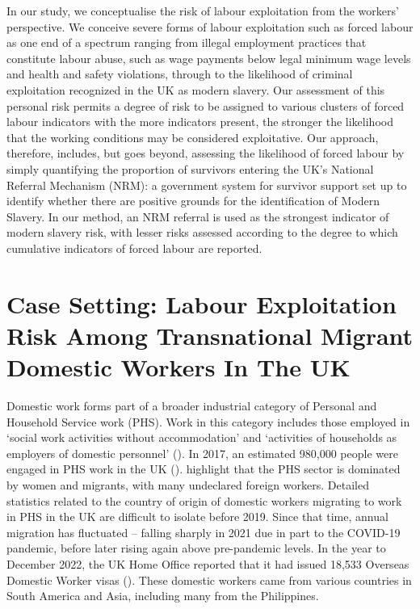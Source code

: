 \documentclass[
  12pt,
]{article}
\theoremstyle{plain}
\theoremstyle{definition}
\begin{document}
In our study, we conceptualise the risk of labour exploitation from the
workers' perspective. We conceive severe forms of labour exploitation
such as forced labour as one end of a spectrum ranging from illegal
employment practices that constitute labour abuse, such as wage payments
below legal minimum wage levels and health and safety violations,
through to the likelihood of criminal exploitation recognized in the UK
as modern slavery. Our assessment of this personal risk permits a degree
of risk to be assigned to various clusters of forced labour indicators
with the more indicators present, the stronger the likelihood that the
working conditions may be considered exploitative. Our approach,
therefore, includes, but goes beyond, assessing the likelihood of forced
labour by simply quantifying the proportion of survivors entering the
UK's National Referral Mechanism (NRM): a government system for survivor
support set up to identify whether there are positive grounds for the
identification of Modern Slavery. In our method, an NRM referral is used
as the strongest indicator of modern slavery risk, with lesser risks
assessed according to the degree to which cumulative indicators of
forced labour are reported.

\section{Case Setting: Labour Exploitation Risk Among Transnational
Migrant Domestic Workers In The
UK}\label{case-setting-labour-exploitation-risk-among-transnational-migrant-domestic-workers-in-the-uk}

Domestic work forms part of a broader industrial category of Personal
and Household Service work (PHS). Work in this category includes those
employed in `social work activities without accommodation' and
`activities of households as employers of domestic personnel'
(\textcite{european_commission_staff_2012}). In 2017, an estimated
980,000 people were engaged in PHS work in the UK
(\textcite{manoudi_analysis_2018}). \textcite{manoudi_analysis_2018}
highlight that the PHS sector is dominated by women and migrants, with
many undeclared foreign workers. Detailed statistics related to the
country of origin of domestic workers migrating to work in PHS in the UK
are difficult to isolate before 2019. Since that time, annual migration
has fluctuated -- falling sharply in 2021 due in part to the COVID-19
pandemic, before later rising again above pre-pandemic levels. In the
year to December 2022, the UK Home Office reported that it had issued
18,533 Overseas Domestic Worker visas (\textcite{home_office_why_2023}).
These domestic workers came from various countries in South America and
Asia, including many from the Philippines.
\end{document}

